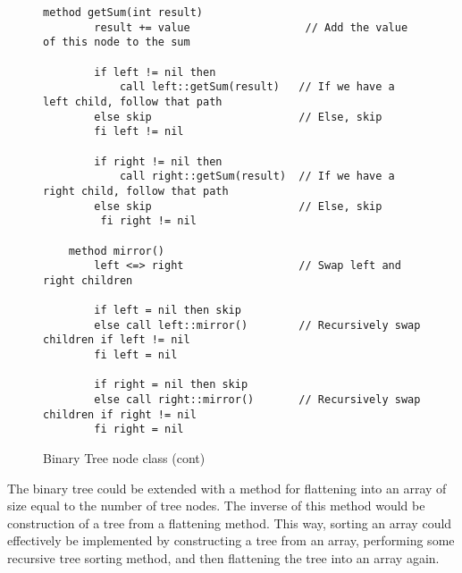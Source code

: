 \begin{figure}[ht!]
    \centering
    \begin{lstlisting}[style = basic, language = roopl] 
    method getSum(int result)
        result += value                  // Add the value of this node to the sum   

        if left != nil then
            call left::getSum(result)   // If we have a left child, follow that path
        else skip                       // Else, skip
        fi left != nil

        if right != nil then
            call right::getSum(result)  // If we have a right child, follow that path
        else skip                       // Else, skip
         fi right != nil

    method mirror()
        left <=> right                  // Swap left and right children

        if left = nil then skip
        else call left::mirror()        // Recursively swap children if left != nil
        fi left = nil

        if right = nil then skip
        else call right::mirror()       // Recursively swap children if right != nil
        fi right = nil 
    \end{lstlisting}
    \caption{Binary Tree node class (cont)}
    \label{fig:binary-tree-node-class-cont}
\end{figure}

The binary tree could be extended with a method for flattening into an array of size equal to the number of tree nodes. The inverse of this method would be construction of a tree from a flattening method. This way, sorting an array could effectively be implemented by constructing a tree from an array, performing some recursive tree sorting method, and then flattening the tree into an array again.

